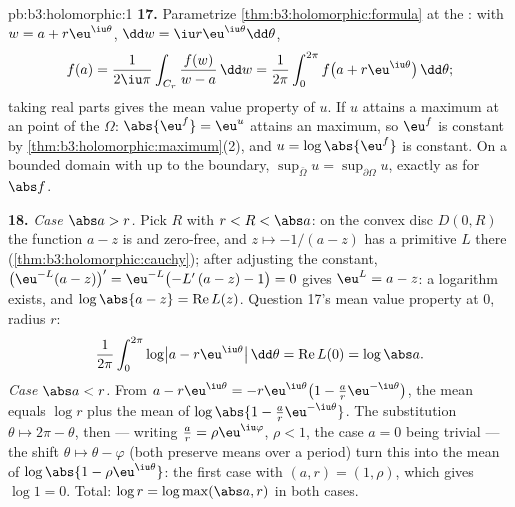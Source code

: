 \begin{solution}{pb:b3:holomorphic:1}
\textbf{17.} Parametrize \cref{thm:b3:holomorphic:formula}
at the : with $w = a + r\eu^{\iu\theta}$, $\dd w = \iu
r\eu^{\iu\theta}\dd\theta$,
\[
f(a) = \frac1{2\iu\pi}\int_{C_r}\frac{f(w)}{w - a}\,\dd w
= \frac1{2\pi}\int_0^{2\pi}
f\bigl(a + r\eu^{\iu\theta}\bigr)\,\dd\theta ;
\]
taking real parts gives the mean value property of $u$. If
$u$ attains a maximum at an  point of the 
$\Omega$: $\abs{\eu^f} = \eu^u$ attains an  maximum,
so $\eu^f$ is constant by
\cref{thm:b3:holomorphic:maximum}(2), and $u =
\log\abs{\eu^f}$ is constant. On a bounded domain with
 up to the boundary, $\sup_{\bar\Omega}u =
\sup_{\partial\Omega}u$, exactly as for $\abs f$.

\textbf{18.} \emph{Case $\abs a > r$.} Pick $R$ with $r < R
< \abs a$: on the convex disc $D(0, R)$ the function $a - z$
is  and zero-free, and $z \mapsto -1/(a - z)$ has
a primitive $L$ there (\cref{thm:b3:holomorphic:cauchy});
after adjusting the constant, $\bigl(\eu^{-L}(a -
z)\bigr)' = \eu^{-L}\bigl(-L'\,(a - z) - 1\bigr) = 0$ gives
$\eu^L = a - z$: a  logarithm exists, and
$\log\abs{a - z} = \operatorname{Re}L(z)$. Question 17's
mean value property at $0$, radius $r$:
\[
\frac1{2\pi}\int_0^{2\pi}
\log\bigl|a - r\eu^{\iu\theta}\bigr|\,\dd\theta
= \operatorname{Re}L(0) = \log\abs a .
\]
\emph{Case $\abs a < r$.} From $a - r\eu^{\iu\theta} =
-r\eu^{\iu\theta}\bigl(1 - \frac ar\eu^{-\iu\theta}\bigr)$,
the mean equals $\log r$ plus the mean of $\log\abs{1 -
\frac ar\eu^{-\iu\theta}}$. The substitution $\theta \mapsto
2\pi - \theta$, then --- writing $\frac ar =
\rho\eu^{\iu\varphi}$, $\rho < 1$, the case $a = 0$ being
trivial --- the shift $\theta \mapsto \theta - \varphi$
(both preserve means over a period) turn this into the mean
of $\log\abs{1 - \rho\eu^{\iu\theta}}$: the first case with
$(a, r) = (1, \rho)$, which gives $\log 1 = 0$. Total:
$\log r = \log\max(\abs a, r)$ in both cases.


\end{solution}
